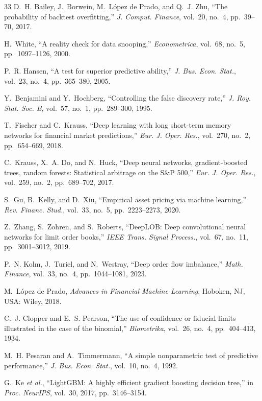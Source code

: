 \documentclass[conference]{IEEEtran}
\begin{document}
\begin{thebibliography}{33}
 D.~H. Bailey, J.~Borwein, M.~L\'opez de Prado, and Q.~J. Zhu, ``The probability of backtest overfitting,'' \emph{J. Comput. Finance}, vol.~20, no.~4, pp.~39--70, 2017.

 H.~White, ``A reality check for data snooping,'' \emph{Econometrica}, vol.~68, no.~5, pp.~1097--1126, 2000.

 P.~R. Hansen, ``A test for superior predictive ability,'' \emph{J. Bus. Econ. Stat.}, vol.~23, no.~4, pp.~365--380, 2005.

 Y.~Benjamini and Y.~Hochberg, ``Controlling the false discovery rate,'' \emph{J. Roy. Stat. Soc. B}, vol.~57, no.~1, pp.~289--300, 1995.

 T.~Fischer and C.~Krauss, ``Deep learning with long short-term memory networks for financial market predictions,'' \emph{Eur. J. Oper. Res.}, vol.~270, no.~2, pp.~654--669, 2018.

 C.~Krauss, X.~A. Do, and N.~Huck, ``Deep neural networks, gradient-boosted trees, random forests: Statistical arbitrage on the S\&P 500,'' \emph{Eur. J. Oper. Res.}, vol.~259, no.~2, pp.~689--702, 2017.

 S.~Gu, B.~Kelly, and D.~Xiu, ``Empirical asset pricing via machine learning,'' \emph{Rev. Financ. Stud.}, vol.~33, no.~5, pp.~2223--2273, 2020.

 Z.~Zhang, S.~Zohren, and S.~Roberts, ``DeepLOB: Deep convolutional neural networks for limit order books,'' \emph{IEEE Trans. Signal Process.}, vol.~67, no.~11, pp.~3001--3012, 2019.

 P.~N. Kolm, J.~Turiel, and N.~Westray, ``Deep order flow imbalance,'' \emph{Math. Finance}, vol.~33, no.~4, pp.~1044--1081, 2023.

 M.~L\'opez de Prado, \emph{Advances in Financial Machine Learning}. Hoboken, NJ, USA: Wiley, 2018.

 C.~J. Clopper and E.~S. Pearson, ``The use of confidence or fiducial limits illustrated in the case of the binomial,'' \emph{Biometrika}, vol.~26, no.~4, pp.~404--413, 1934.

 M.~H. Pesaran and A.~Timmermann, ``A simple nonparametric test of predictive performance,'' \emph{J. Bus. Econ. Stat.}, vol.~10, no.~4, 1992.

 G.~Ke \emph{et al.}, ``LightGBM: A highly efficient gradient boosting decision tree,'' in \emph{Proc. NeurIPS}, vol.~30, 2017, pp.~3146--3154.


\end{thebibliography}
\end{document}
